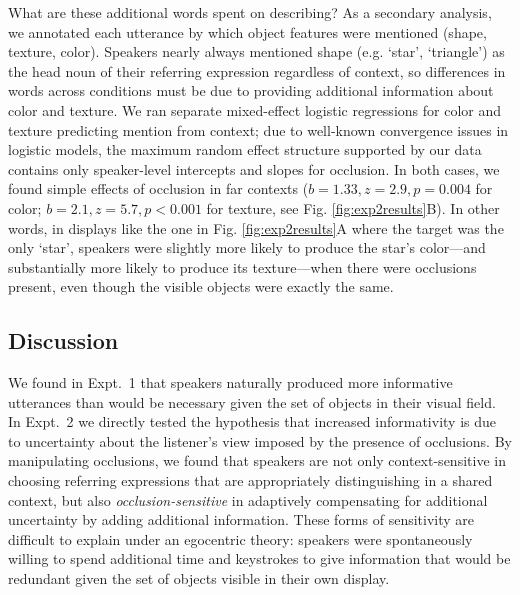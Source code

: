 \documentclass[manuscript]{stjour}
\begin{document}
What are these additional words spent on describing? As a secondary analysis, we annotated each utterance by which object features were mentioned (shape, texture, color). Speakers nearly always mentioned shape  (e.g. `star', `triangle') as the head noun of their referring expression regardless of context, so differences in words across conditions must be due to providing additional information about color and texture. We ran separate mixed-effect logistic regressions for color and texture predicting mention from context; due to well-known convergence issues in logistic models, the maximum random effect structure supported by our data contains only speaker-level intercepts and slopes for occlusion. In both cases, we found simple effects of occlusion in far contexts ($b = 1.33, z = 2.9, p = 0.004$ for color; $b = 2.1, z = 5.7, p < 0.001$ for texture, see Fig. \ref{fig:exp2results}B). In other words, in displays like the one in Fig. \ref{fig:exp2results}A where the target was the only `star', speakers were slightly more likely to produce the star's color---and substantially more likely to produce its texture---when there were occlusions present, even though the visible objects were exactly the same. 


\subsection{Discussion}

We found in Expt.~1 that speakers naturally produced more informative utterances than would be necessary given the set of objects in their visual field. In Expt.~2 we directly tested the hypothesis that increased informativity is due to uncertainty about the listener's view imposed by the presence of occlusions. By manipulating occlusions, we found that speakers are not only context-sensitive in choosing referring expressions that are appropriately distinguishing in a shared context, but also \emph{occlusion-sensitive} in adaptively compensating for additional uncertainty by adding additional information. These forms of sensitivity are difficult to explain under an egocentric theory: speakers were spontaneously willing to spend additional time and keystrokes to give information that would be redundant given the set of objects visible in their own display. 
\end{document}
